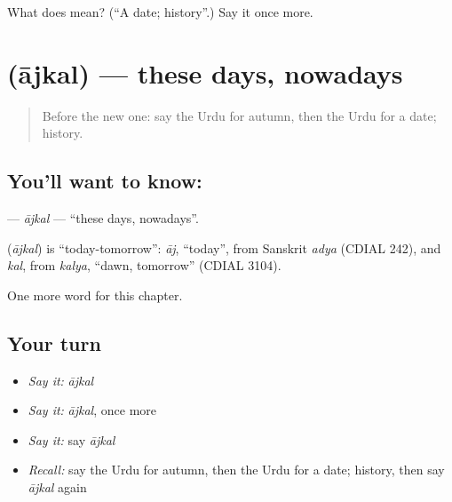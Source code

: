 \begin{tcolorbox}[breakable,colback=teal!4,colframe=teal!35!black,title={Before you move on}]
What does  mean? (\textquotedblleft{}A date; history\textquotedblright{}.) Say it once more.
\end{tcolorbox}
\section[\texorpdfstring{\ur{آجکل} (ājkal)}{آجکل (ājkal)}]{ (ājkal) — these days, nowadays}

\label{lesson:UR-C95-ajkal}



\begin{quote}
Before the new one: say the Urdu for autumn, then the Urdu for a date; history.
\end{quote}

\subsection*{You'll want to know: }
\textbf{} — \emph{ājkal} — \textquotedblleft{}these days, nowadays\textquotedblright{}.

\begin{cousinweb}
\textbf{} (\emph{ājkal}) is \textquotedblleft{}today-tomorrow\textquotedblright{}: \emph{āj}, \textquotedblleft{}today\textquotedblright{}, from Sanskrit \emph{adya} (CDIAL 242), and \emph{kal}, from \emph{kalya}, \textquotedblleft{}dawn, tomorrow\textquotedblright{} (CDIAL 3104).
\end{cousinweb}

\begin{grammarlens}[title={What you've built}]
One more word for this chapter.
\end{grammarlens}

\subsection*{Your turn}
\begin{itemize}
\raggedright
  \item \emph{Say it:} \emph{ājkal}
  \item \emph{Say it:} \emph{ājkal}, once more
  \item \emph{Say it:} say \emph{ājkal}
  \item \emph{Recall:} say the Urdu for autumn, then the Urdu for a date; history, then say \emph{ājkal} again
\end{itemize}

